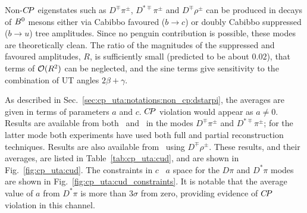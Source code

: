Non-$C\!P$ eigenstates such as $D^\mp\pi^\pm$, $D^{*\mp}\pi^\pm$ and $D^\mp\rho^\pm$ can be produced 
in decays of $B^0$ mesons either via Cabibbo favoured ($b \to c$) or
doubly Cabibbo suppressed ($b \to u$) tree amplitudes. 
Since no penguin contribution is possible,
these modes are theoretically clean.
The ratio of the magnitudes of the suppressed and favoured amplitudes, $R$,
is sufficiently small (predicted to be about $0.02$),
that terms of ${\cal O}(R^2)$ can be neglected, 
and the sine terms give sensitivity to the combination of UT angles $2\beta+\gamma$.

As described in Sec.~\ref{sec:cp_uta:notations:non_cp:dstarpi},
the averages are given in terms of parameters $a$ and $c$.
$C\!P$ violation would appear as $a \neq 0$.
Results are available from both \babar\ and \belle\ in the modes
$D^\mp\pi^\pm$ and $D^{*\mp}\pi^\pm$; for the latter mode both experiments 
have used both full and partial reconstruction techniques.
Results are also available from \babar\ using $D^\mp\rho^\pm$.
These results, and their averages, are listed in Table~\ref{tab:cp_uta:cud},
and are shown in Fig.~\ref{fig:cp_uta:cud}.
The constraints in $c$ \vs\ $a$ space for the $D\pi$ and $D^*\pi$ modes
are shown in Fig.~\ref{fig:cp_uta:cud_constraints}.
It is notable that the average value of $a$ from $D^*\pi$ is more than
$3\sigma$ from zero, providing evidence of $C\!P$ violation in this channel.



